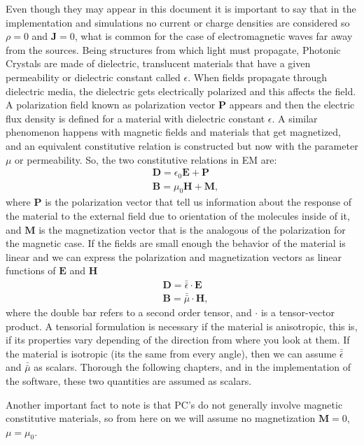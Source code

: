 Even though they may appear in this document it is important to say that in the implementation and simulations no current or charge densities are considered so $\rho = 0$ and $\mathbf{J} =0$, what is common for the case of electromagnetic waves far away from the sources.
Being structures from which light must propagate, Photonic Crystals are made of dielectric, translucent  materials that have a given permeability or dielectric constant called $\epsilon$. When fields propagate through dielectric media, the dielectric gets electrically polarized and this affects the field. A polarization field known as polarization vector $\mathbf{P}$ appears and then the electric flux density is defined for a material with dielectric constant $\epsilon$.  A similar phenomenon happens with magnetic fields and materials that get magnetized, and an equivalent constitutive relation is constructed but now with the parameter $\mu$ or permeability.
So, the two constitutive relations in EM are:
\begin{align}
&\mathbf{D} = \epsilon_0 \mathbf{E} + \mathbf{P}\\
&\mathbf{B} = \mu_0  \mathbf{H} + \mathbf{M},
\end{align}
where $\mathbf{P}$ is the polarization vector that tell us information about the response of the material to the external field due to orientation of the molecules inside of it, and $\mathbf{M}$ is the magnetization vector that is the analogous of the polarization for the magnetic case. If the fields are small enough the behavior of the material is linear and we can express the polarization and magnetization vectors as linear functions of $\mathbf{E}$ and $\mathbf{H}$
\begin{align}
&\mathbf{D} = \bar{\bar{\epsilon}} \cdot \mathbf{E}\\
&\mathbf{B} = \bar{\bar{\mu}} \cdot \mathbf{H},
\end{align}
where the double bar refers to a second order tensor, and $\cdot$ is a tensor-vector product. A tensorial formulation is necessary if the material is anisotropic, this is, if its properties vary depending of the direction from where you look at them. If the material is isotropic (its the same from every angle), then we can assume $\bar{\bar{\epsilon}}$ and $\bar{\bar{\mu}}$ as scalars. Thorough the following chapters, and in the implementation of the software, these two quantities are assumed as scalars.

Another important fact to note is that PC's do not generally involve magnetic constitutive materials, so from here on we will assume no magnetization $\mathbf{M} = 0$, $\mu = \mu_0$. 


